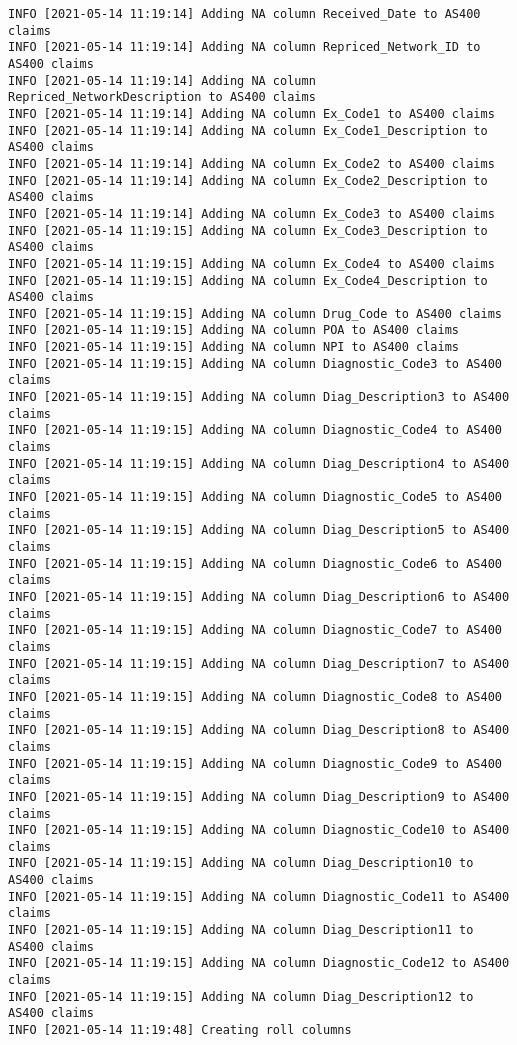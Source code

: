 \documentclass[
]{book}
\begin{document}
\begin{verbatim}
INFO [2021-05-14 11:19:14] Adding NA column Received_Date to AS400 claims
INFO [2021-05-14 11:19:14] Adding NA column Repriced_Network_ID to AS400 claims
INFO [2021-05-14 11:19:14] Adding NA column Repriced_NetworkDescription to AS400 claims
INFO [2021-05-14 11:19:14] Adding NA column Ex_Code1 to AS400 claims
INFO [2021-05-14 11:19:14] Adding NA column Ex_Code1_Description to AS400 claims
INFO [2021-05-14 11:19:14] Adding NA column Ex_Code2 to AS400 claims
INFO [2021-05-14 11:19:14] Adding NA column Ex_Code2_Description to AS400 claims
INFO [2021-05-14 11:19:14] Adding NA column Ex_Code3 to AS400 claims
INFO [2021-05-14 11:19:15] Adding NA column Ex_Code3_Description to AS400 claims
INFO [2021-05-14 11:19:15] Adding NA column Ex_Code4 to AS400 claims
INFO [2021-05-14 11:19:15] Adding NA column Ex_Code4_Description to AS400 claims
INFO [2021-05-14 11:19:15] Adding NA column Drug_Code to AS400 claims
INFO [2021-05-14 11:19:15] Adding NA column POA to AS400 claims
INFO [2021-05-14 11:19:15] Adding NA column NPI to AS400 claims
INFO [2021-05-14 11:19:15] Adding NA column Diagnostic_Code3 to AS400 claims
INFO [2021-05-14 11:19:15] Adding NA column Diag_Description3 to AS400 claims
INFO [2021-05-14 11:19:15] Adding NA column Diagnostic_Code4 to AS400 claims
INFO [2021-05-14 11:19:15] Adding NA column Diag_Description4 to AS400 claims
INFO [2021-05-14 11:19:15] Adding NA column Diagnostic_Code5 to AS400 claims
INFO [2021-05-14 11:19:15] Adding NA column Diag_Description5 to AS400 claims
INFO [2021-05-14 11:19:15] Adding NA column Diagnostic_Code6 to AS400 claims
INFO [2021-05-14 11:19:15] Adding NA column Diag_Description6 to AS400 claims
INFO [2021-05-14 11:19:15] Adding NA column Diagnostic_Code7 to AS400 claims
INFO [2021-05-14 11:19:15] Adding NA column Diag_Description7 to AS400 claims
INFO [2021-05-14 11:19:15] Adding NA column Diagnostic_Code8 to AS400 claims
INFO [2021-05-14 11:19:15] Adding NA column Diag_Description8 to AS400 claims
INFO [2021-05-14 11:19:15] Adding NA column Diagnostic_Code9 to AS400 claims
INFO [2021-05-14 11:19:15] Adding NA column Diag_Description9 to AS400 claims
INFO [2021-05-14 11:19:15] Adding NA column Diagnostic_Code10 to AS400 claims
INFO [2021-05-14 11:19:15] Adding NA column Diag_Description10 to AS400 claims
INFO [2021-05-14 11:19:15] Adding NA column Diagnostic_Code11 to AS400 claims
INFO [2021-05-14 11:19:15] Adding NA column Diag_Description11 to AS400 claims
INFO [2021-05-14 11:19:15] Adding NA column Diagnostic_Code12 to AS400 claims
INFO [2021-05-14 11:19:15] Adding NA column Diag_Description12 to AS400 claims
INFO [2021-05-14 11:19:48] Creating roll columns

\end{verbatim}
\end{document}
